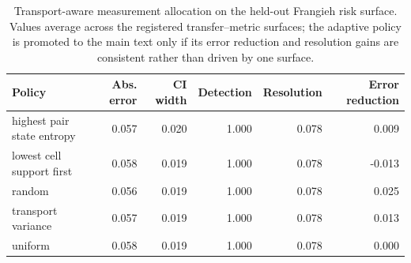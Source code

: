 \begin{table}[t]
\centering
\small
\setlength{\tabcolsep}{3.5pt}
\caption{Transport-aware measurement allocation on the held-out Frangieh risk surface. Values average across the registered transfer--metric surfaces; the adaptive policy is promoted to the main text only if its error reduction and resolution gains are consistent rather than driven by one surface.}
\label{tab:v3-adaptive}
\begin{tabular}{lrrrrr}
\toprule
Policy & Abs. error & CI width & Detection & Resolution & Error reduction \\
\midrule
highest pair state entropy & 0.057 & 0.020 & 1.000 & 0.078 & 0.009 \\
lowest cell support first & 0.058 & 0.019 & 1.000 & 0.078 & -0.013 \\
random & 0.056 & 0.019 & 1.000 & 0.078 & 0.025 \\
transport variance & 0.057 & 0.019 & 1.000 & 0.078 & 0.013 \\
uniform & 0.058 & 0.019 & 1.000 & 0.078 & 0.000 \\
\bottomrule
\end{tabular}
\end{table}
